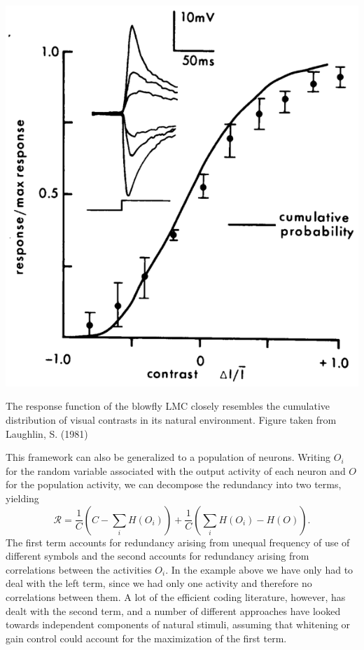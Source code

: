 \begin{marginfigure}
\includegraphics[width=\columnwidth]{figures/laughlin_81.eps}
\label{fig:laughlin}
\caption{The response function of the blowfly LMC closely resembles the cumulative distribution of visual contrasts in its natural environment. Figure taken from Laughlin, S. (1981)}
\end{marginfigure}

This framework can also be generalized to a population of neurons. Writing $O_i$ for the random variable associated with the output activity of each neuron and $O$ for the population activity, we can decompose the redundancy into two terms, yielding
$$
\mathcal{R} = \frac{1}{C} \left(C - \sum_i H(O_i) \right) + \frac{1}{C}\left(\sum_i H(O_i) -H(O)\right).
$$
The first term accounts for redundancy arising from unequal frequency of use of different symbols and the second accounts for redundancy arising from 
correlations between the activities $O_i$. In the example above we have only had to deal with the left term, since we had only one activity and therefore no 
correlations between them. A lot of the efficient coding literature, however, has dealt with the second term, and a number of different approaches have looked 
towards independent components of natural stimuli, assuming that whitening or gain control could account for the maximization of the first term.\par


